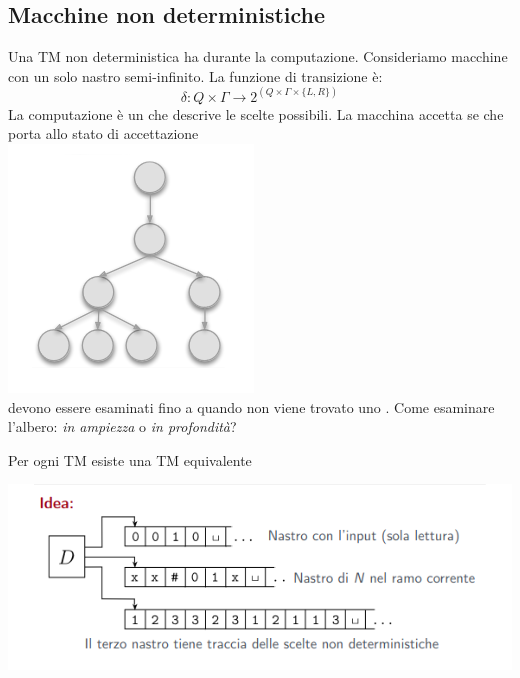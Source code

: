 \subsection{Macchine non deterministiche}
Una TM non deterministica ha  durante la computazione. 
Consideriamo macchine con un solo nastro semi-infinito.
La funzione di transizione è:
$$\delta:Q\times\Gamma\rightarrow 2^{(Q\times\Gamma\times\{L,R\})}$$
La computazione è un  che descrive le scelte possibili.
La macchina accetta se  che porta allo stato di accettazione\\
\includegraphics[scale=0.5]{img/albero.png}\\
 devono essere esaminati fino a quando non viene trovato uno .
Come esaminare l'albero:
\textit{in ampiezza} o \textit{in profondità}?

\begin{theorem}
   Per ogni TM  esiste una TM  equivalente
\end{theorem}
\includegraphics[scale=0.8]{img/idea_non_deterministica.png}

